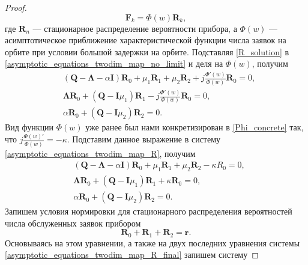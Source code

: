 \begin{proof}
\begin{equation} \label{R_solution}
	\boldsymbol{F}_{k} = \Phi(w)\boldsymbol{R}_{k},
\end{equation}
где $\boldsymbol{R}_{n}$ --- стационарное распределение вероятности прибора, а $\Phi(w)$ --- асимптотическое приближение характеристической функции числа заявок на орбите при условии большой задержки на орбите. Подставляя \eqref{R_solution} в \eqref{asymptotic_equations_twodim_map_no_limit} и деля на $\Phi(w)$, получим
\begin{equation}
	\label{asymptotic_equations_twodim_map_R}
	\begin{split}
		&(\boldsymbol{Q}-\boldsymbol{\Lambda}-\alpha\boldsymbol{I})\boldsymbol{R}_{0} + \mu_{1} \boldsymbol{R}_{1}  +  \mu_{2}\boldsymbol{R}_{2} + j
		\frac{\Phi'(w) }{\Phi(w)}\boldsymbol{R}_{0}  = 0,
		\\
		&\boldsymbol{\Lambda} \boldsymbol{R}_{0} +  (\boldsymbol{Q} - \boldsymbol{I}\mu_{1})\boldsymbol{R}_{1} - j\frac{\Phi'(w) }{\Phi(w)}
		\boldsymbol{R}_{0}  = 0,
		\\
		&\alpha \boldsymbol{R}_{0} + (\boldsymbol{Q} - \boldsymbol{I}\mu_{2})\boldsymbol{R}_{2}  = 0.
	\end{split}
\end{equation}
Вид функции $\Phi(w)$ уже ранее был нами конкретизирован в \eqref{Phi_concrete} так, что $j\frac{\Phi(w)'}{\Phi(w)} = -\kappa$. Подставим данное выражение в систему \eqref{asymptotic_equations_twodim_map_R}, получим
\begin{equation}
	\label{asymptotic_equations_twodim_map_R_final}
	\begin{split}
		&(\boldsymbol{Q}-\boldsymbol{\Lambda}-\alpha\boldsymbol{I})\boldsymbol{R}_{0} + \mu_{1} \boldsymbol{R}_{1}  +  \mu_{2}\boldsymbol{R}_{2} -\kappa{R}_{0}  = 0,
		\\
		&\boldsymbol{\Lambda} \boldsymbol{R}_{0} +  (\boldsymbol{Q} - \boldsymbol{I}\mu_{1})\boldsymbol{R}_{1} + \kappa
		\boldsymbol{R}_{0}  = 0,
		\\
		&\alpha \boldsymbol{R}_{0} + (\boldsymbol{Q} - \boldsymbol{I}\mu_{2})\boldsymbol{R}_{2}  = 0.
	\end{split}
\end{equation}
Запишем условия нормировки для стационарного распределения вероятностей числа обслуженных заявок прибором
\begin{equation*}
	\boldsymbol{R}_{0} + \boldsymbol{R}_{1} + \boldsymbol{R}_{2} = \boldsymbol{r}.
\end{equation*}
Основываясь на этом уравнении, а также на двух последних уравнения системы \eqref{asymptotic_equations_twodim_map_R_final} запишем систему

\end{proof}
